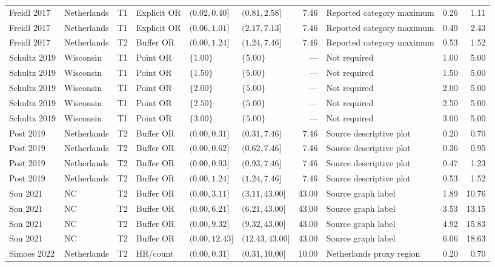 \documentclass[11pt]{article}
\begin{document}
\begin{landscape}
\begin{table}[p]
{\begin{tabular}{llclllrlrr}
Freidl 2017 & Netherlands & T1 & Explicit OR & $(0.02,0.40]$ & $(0.81,2.58]$ & 7.46 & Reported category maximum & 0.26 & 1.11 \\
Freidl 2017 & Netherlands & T1 & Explicit OR & $(0.06,1.01]$ & $(2.17,7.13]$ & 7.46 & Reported category maximum & 0.49 & 2.43 \\
Freidl 2017 & Netherlands & T2 & Buffer OR & $(0.00,1.24]$ & $(1.24,7.46]$ & 7.46 & Reported category maximum & 0.53 & 1.52 \\
Schultz 2019 & Wisconsin & T1 & Point OR & $\{1.00\}$ & $\{5.00\}$ & --- & Not required & 1.00 & 5.00 \\
Schultz 2019 & Wisconsin & T1 & Point OR & $\{1.50\}$ & $\{5.00\}$ & --- & Not required & 1.50 & 5.00 \\
Schultz 2019 & Wisconsin & T1 & Point OR & $\{2.00\}$ & $\{5.00\}$ & --- & Not required & 2.00 & 5.00 \\
Schultz 2019 & Wisconsin & T1 & Point OR & $\{2.50\}$ & $\{5.00\}$ & --- & Not required & 2.50 & 5.00 \\
Schultz 2019 & Wisconsin & T1 & Point OR & $\{3.00\}$ & $\{5.00\}$ & --- & Not required & 3.00 & 5.00 \\
Post 2019 & Netherlands & T2 & Buffer OR & $(0.00,0.31]$ & $(0.31,7.46]$ & 7.46 & Source descriptive plot & 0.20 & 0.70 \\
Post 2019 & Netherlands & T2 & Buffer OR & $(0.00,0.62]$ & $(0.62,7.46]$ & 7.46 & Source descriptive plot & 0.36 & 0.95 \\
Post 2019 & Netherlands & T2 & Buffer OR & $(0.00,0.93]$ & $(0.93,7.46]$ & 7.46 & Source descriptive plot & 0.47 & 1.23 \\
Post 2019 & Netherlands & T2 & Buffer OR & $(0.00,1.24]$ & $(1.24,7.46]$ & 7.46 & Source descriptive plot & 0.53 & 1.52 \\
Son 2021 & NC & T2 & Buffer OR & $(0.00,3.11]$ & $(3.11,43.00]$ & 43.00 & Source graph label & 1.89 & 10.76 \\
Son 2021 & NC & T2 & Buffer OR & $(0.00,6.21]$ & $(6.21,43.00]$ & 43.00 & Source graph label & 3.53 & 13.15 \\
Son 2021 & NC & T2 & Buffer OR & $(0.00,9.32]$ & $(9.32,43.00]$ & 43.00 & Source graph label & 4.92 & 15.83 \\
Son 2021 & NC & T2 & Buffer OR & $(0.00,12.43]$ & $(12.43,43.00]$ & 43.00 & Source graph label & 6.06 & 18.63 \\
Simoes 2022 & Netherlands & T2 & HR/count & $(0.00,0.31]$ & $(0.31,10.00]$ & 10.00 & Netherlands proxy region & 0.20 & 0.70 \\

\end{tabular}}
\end{table}
\end{landscape}
\end{document}
